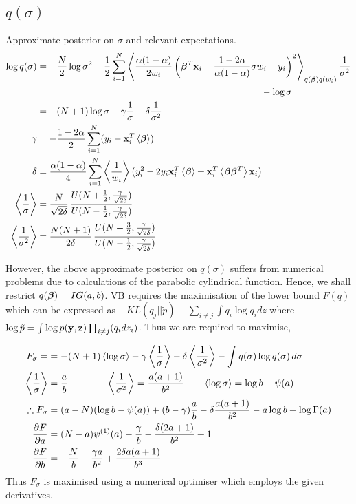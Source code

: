 \begin{appendices}
\subsection{$q(\sigma)$}
\label{sec:q_sigma}
Approximate posterior on $\sigma$ and relevant expectations.
\begin{align}
\nonumber \log q(\sigma) & =-\frac{N}{2}\log \sigma^2-\frac{1}{2}\sum_{i=1}^{N}\left\langle\frac{\alpha(1-\alpha)}{2 w_i}\left(\bm{\beta}^T \mathbf{x}_i+\frac{1-2\alpha}{\alpha(1-\alpha)}\sigma w_i-y_i\right)^2\right\rangle_{q(\bm{\beta})q(w_i)}\frac{1}{\sigma^2}\\
\nonumber &\qquad\qquad\qquad\qquad\qquad\qquad\qquad\qquad\qquad\qquad\qquad\qquad-\log \sigma\\
\nonumber &=-(N+1)\log \sigma-\gamma\frac{1}{\sigma}-\delta\frac{1}{\sigma^2}\\
\gamma &= -{\frac{1-2\alpha}{2}\sum_{i=1}^{N}(y_i-\mathbf{x}_i^T\left\langle\bm{\beta}\right\rangle)}\\
\delta &=\frac{\alpha(1-\alpha)}{4}\sum_{i=1}^{N}\left\langle\frac{1}{w_i}\right\rangle\left(y_i^2-2y_i\mathbf{x}_i^T\left\langle\bm{\beta}\right\rangle+\mathbf{x}_i^T\left\langle\bm{\beta}\bm{\beta}^T\right\rangle\mathbf{x}_i\right)\\
\left\langle\frac{1}{\sigma}\right\rangle&=\frac{N}{\sqrt{2\delta}}\,\frac{U(N+\frac{1}{2},\frac{\gamma}{\sqrt{2\delta}})}{U(N-\frac{1}{2},\frac{\gamma}{\sqrt{2\delta}})}\\
\left\langle\frac{1}{\sigma^2}\right\rangle&=\frac{N(N+1)}{2\delta}\,\frac{U(N+\frac{3}{2},\frac{\gamma}{\sqrt{2\delta}})}{U(N-\frac{1}{2},\frac{\gamma}{\sqrt{2\delta}})}
\end{align}

However, the above approximate posterior on $q(\sigma)$ suffers from numerical problems due to calculations of the parabolic cylindrical function. Hence, we shall restrict $q(\bm{\beta})=IG(a,b)$. VB requires the maximisation of the lower bound $F(q)$ which can be expressed as $-KL(q_j||\tilde{p})-\sum_{i\ne j}\int q_i\log q_i dz$ where $\log\tilde{p}=\int \log p(\mathbf{y},\mathbf{z})\prod_{i\ne j}(q_i dz_i)$. Thus we are required to maximise,

\begin{align}
\nonumber F_\sigma=&=-(N+1)\left\langle\log \sigma\right\rangle-\gamma\left\langle\frac{1}{\sigma}\right\rangle-\delta\left\langle\frac{1}{\sigma^2}\right\rangle-\int q(\sigma)\log q(\sigma)\,d\sigma\\
\nonumber \left\langle\frac{1}{\sigma}\right\rangle&=\frac{a}{b} \qquad\qquad \left\langle\frac{1}{\sigma^2}\right\rangle=\frac{a(a+1)}{b^2} \qquad \left\langle\log \sigma\right\rangle=\log b -\psi(a)\\
\therefore F_\sigma&=(a-N)(\log b-\psi(a))+(b-\gamma)\frac{a}{b}-\delta \frac{a(a+1)}{b^2}-a\log b+\log \Gamma(a)\\
\frac{\partial F}{\partial a}&=(N-a)\psi^{(1)}(a)-\frac{\gamma}{b}-\frac{\delta(2a+1)}{b^2}+1\\
\frac{\partial F}{\partial b}&=-\frac{N}{b}+\frac{\gamma a}{b^2}+\frac{2\delta a(a+1)}{b^3}
\end{align}
Thus $F_\sigma$ is maximised using a numerical optimiser which employs the given derivatives.


\end{appendices}
